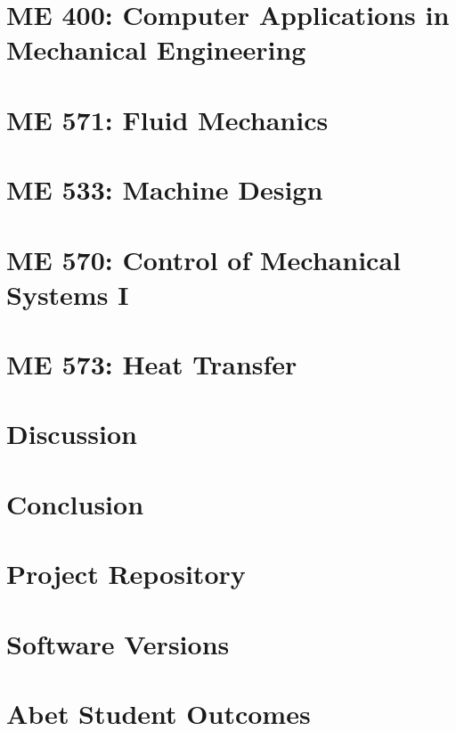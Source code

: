 \documentclass[12pt]{report}
\begin{document}
    \clearpage
    \chapter{ME 400: Computer Applications in Mechanical Engineering}
    
    
    \clearpage
    \chapter{ME 571: Fluid Mechanics}
    

    \clearpage
    \chapter{ME 533: Machine Design}
    

    \clearpage
    \chapter{ME 570: Control of Mechanical Systems I}
    

    \clearpage
    \chapter{ME 573: Heat Transfer}
    
    
    \clearpage
    \chapter{Discussion}
    

    \clearpage
    \chapter{Conclusion}
    

    \clearpage
    \appendix
    \chapter{Project Repository}
    \label{appendix:appendix_github}
    

    \clearpage
    \chapter{Software Versions}
    \label{appendix:appendix_versions}
    

    \chapter{Abet Student Outcomes}
    \label{appendix:appendix_abet}
    
\end{document}
